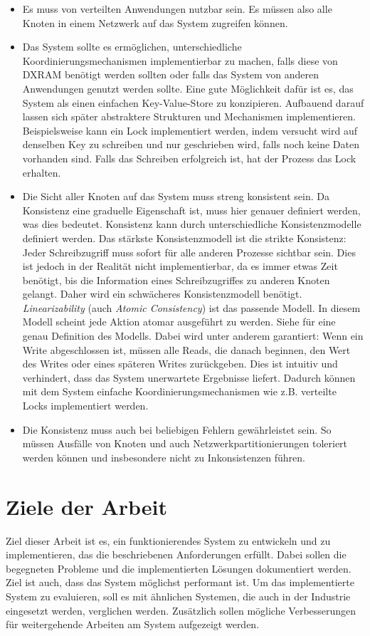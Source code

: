 \begin{itemize}
	\item Es muss von verteilten Anwendungen nutzbar sein. Es müssen also alle Knoten in einem Netzwerk auf das System zugreifen können.
	\item Das System sollte es ermöglichen, unterschiedliche Koordinierungsmechanismen implementierbar zu machen, falls diese von DXRAM benötigt werden sollten oder falls das System von anderen Anwendungen genutzt werden sollte. Eine gute Möglichkeit dafür ist es, das System als einen einfachen Key-Value-Store zu konzipieren. Aufbauend darauf lassen sich später abstraktere Strukturen und Mechanismen implementieren. Beispielsweise kann ein Lock implementiert werden, indem versucht wird auf denselben Key zu schreiben und nur geschrieben wird, falls noch keine Daten vorhanden sind. Falls das Schreiben erfolgreich ist, hat der Prozess das Lock erhalten.
	\item Die Sicht aller Knoten auf das System muss streng konsistent sein. Da Konsistenz eine graduelle Eigenschaft ist, muss hier genauer definiert werden, was dies bedeutet. Konsistenz kann durch unterschiedliche Konsistenzmodelle definiert werden. Das stärkste Konsistenzmodell ist die strikte Konsistenz: Jeder Schreibzugriff muss sofort für alle anderen Prozesse sichtbar sein. Dies ist jedoch in der Realität nicht implementierbar, da es immer etwas Zeit benötigt, bis die Information eines Schreibzugriffes zu anderen Knoten gelangt. Daher wird ein schwächeres Konsistenzmodell benötigt.  \textit{Linearizability} (auch \textit{Atomic Consistency}) ist das passende Modell. In diesem Modell scheint jede Aktion atomar ausgeführt zu werden. Siehe \cite{linearizability} für eine genau Definition des Modells. Dabei wird unter anderem garantiert: Wenn ein Write abgeschlossen ist, müssen alle Reads, die danach beginnen, den Wert des Writes oder eines späteren Writes zurückgeben. Dies ist intuitiv und verhindert, dass das System unerwartete Ergebnisse liefert. Dadurch können mit dem System einfache Koordinierungsmechanismen wie z.B. verteilte Locks implementiert werden.
	\item Die Konsistenz muss auch bei beliebigen Fehlern gewährleistet sein. So müssen Ausfälle von Knoten und auch Netzwerkpartitionierungen toleriert werden können und insbesondere nicht zu Inkonsistenzen führen.
\end{itemize}

\section{Ziele der Arbeit}
\label{ziele}

Ziel dieser Arbeit ist es, ein funktionierendes System zu entwickeln und zu implementieren, das die beschriebenen Anforderungen erfüllt. Dabei sollen die begegneten Probleme und die implementierten Lösungen dokumentiert werden. Ziel ist auch, dass das System möglichst performant ist. Um das implementierte System zu evaluieren, soll es mit ähnlichen Systemen, die auch in der Industrie eingesetzt werden, verglichen werden. Zusätzlich sollen mögliche Verbesserungen für weitergehende Arbeiten am System aufgezeigt werden.
